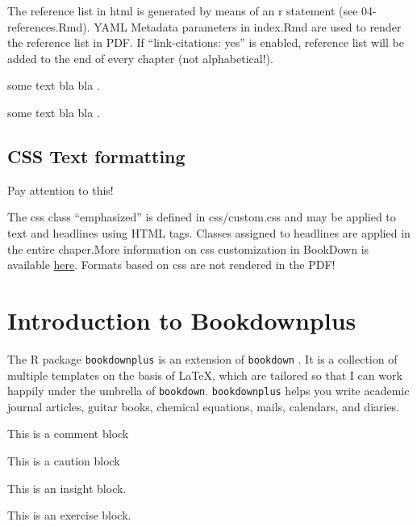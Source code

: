 \documentclass[]{book}
\theoremstyle{definition}
\theoremstyle{definition}
\theoremstyle{definition}
\theoremstyle{remark}
\let\BeginKnitrBlock\begin \let\EndKnitrBlock\end
\begin{document}
\BeginKnitrBlock{rmdtip}
The reference list in html is generated by means of an r statement (see
04-references.Rmd). YAML Metadata parameters in index.Rmd are used to
render the reference list in PDF. If ``link-citations: yes'' is enabled,
reference list will be added to the end of every chapter (not
alphabetical!).
\EndKnitrBlock{rmdtip}

\citep{holland1992}

some text bla bla \citep{alexandrowicz1980}.

\citep{grimm2005}

some text bla bla \citet{eden1961}.

\section{CSS Text formatting}\label{css-text-formatting}

{Pay attention to this!}

\BeginKnitrBlock{rmdcomment}
The css class ``emphasized'' is defined in css/custom.css and may be
applied to text and headlines using HTML tags. Classes assigned to
headlines are applied in the entire chaper.More information on css
customization in BookDown is available
\href{https://bookdown.org/yihui/rmarkdown/custom-css-1.html}{here}.
Formats based on css are not rendered in the PDF!
\EndKnitrBlock{rmdcomment}

\chapter{Introduction to
Bookdownplus}\label{introduction-to-bookdownplus}

The R package \texttt{bookdownplus} \citep{R-bookdownplus} is an
extension of \texttt{bookdown} \citep{R-bookdown}. It is a collection of
multiple templates on the basis of LaTeX, which are tailored so that I
can work happily under the umbrella of \texttt{bookdown}.
\texttt{bookdownplus} helps you write academic journal articles, guitar
books, chemical equations, mails, calendars, and diaries.

\BeginKnitrBlock{rmdcomment}
This is a comment block
\EndKnitrBlock{rmdcomment}

\BeginKnitrBlock{rmdcaution}
This is a caution block
\EndKnitrBlock{rmdcaution}

\BeginKnitrBlock{rmdinsight}
This is an insight block.
\EndKnitrBlock{rmdinsight}

\BeginKnitrBlock{rmdexercise}
This is an exercise block.
\EndKnitrBlock{rmdexercise}
\end{document}
